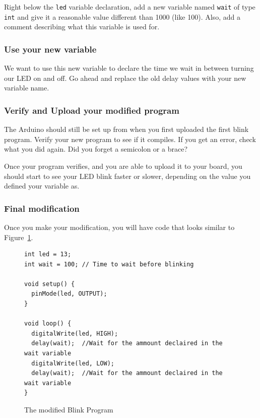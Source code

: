 \documentclass[11pt,a4paper]{article}
\begin{document}
Right below the \texttt{led} variable declaration, add a new variable named \texttt{wait} of type \texttt{int} and give it a reasonable value different than 1000 (like 100).  Also, add a comment describing what this variable is used for.

\subsubsection{Use your new variable} %
\label{ssub:use_your_new_variable}

We want to use this new variable to declare the time we wait in between turning our LED on and off.  Go ahead and replace the old delay values with your new variable name.  


\subsubsection{Verify and Upload your modified program} %
\label{ssub:verify_and_upload_your_modified_program}

The Arduino should still be set up from when you first uploaded the first blink program.  Verify your new program to see if it compiles.  If you get an error, check what you did again.  Did you forget a semicolon or a brace?

Once your program verifies, and you are able to upload it to your board, you should start to see your LED blink faster or slower, depending on the value you defined your variable as.


\subsubsection{Final modification} %
\label{ssub:final_modification}

Once you make your modification, you will have code that looks similar to Figure~\ref{fig:blinkmod}.
\begin{figure}[htbp]
	\centering
\begin{verbatim}
int led = 13;
int wait = 100; // Time to wait before blinking

void setup() {                
  pinMode(led, OUTPUT);     
} 

void loop() {
  digitalWrite(led, HIGH);   
  delay(wait);  //Wait for the ammount declaired in the wait variable         
  digitalWrite(led, LOW);    
  delay(wait);  //Wait for the ammount declaired in the wait variable        
}
\end{verbatim}
	\caption{The modified Blink Program}
	\label{fig:blinkmod}
\end{figure}
\end{document}
